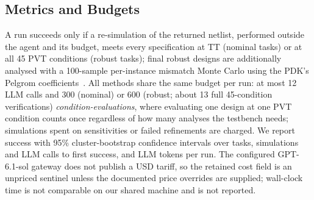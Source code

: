 \subsection{Metrics and Budgets}
A run succeeds only if a re-simulation of the returned netlist, performed outside the agent and its budget, meets every specification at TT
(nominal tasks) or at all 45 PVT conditions (robust tasks); final robust designs are additionally analysed with a
100-sample per-instance mismatch Monte Carlo using the PDK's Pelgrom coefficients~\cite{pelgrom1989matching}. All
methods share the same budget per run: at most 12 LLM calls and 300 (nominal) or 600 (robust; about 13 full 45-condition verifications)
\emph{condition-evaluations}, where evaluating one design at one PVT condition counts once regardless of how many
analyses the testbench needs; simulations spent on sensitivities or failed refinements are charged. We report
success with 95\% cluster-bootstrap confidence intervals over tasks, simulations and LLM calls to first success,
and LLM tokens per run. The configured GPT-6.1-sol gateway does not publish a USD tariff, so the retained cost field
is an unpriced sentinel unless the documented price overrides are supplied; wall-clock time is not comparable on our
shared machine and is not reported.
